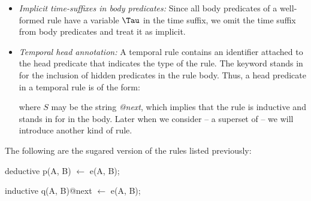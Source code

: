 \begin{itemize}
%
%
\item {\em Implicit time-suffixes in body predicates:} Since all body
predicates of a well-formed rule have a variable $\Tau$ in the time
suffix, we omit the time suffix from body predicates and treat it as implicit.
%
\item {\em Temporal head annotation:} A temporal rule contains an identifier
attached to the head predicate that indicates 
the type of the rule. 
The keyword stands in for the inclusion of hidden predicates in the rule body.
Thus, a head predicate in a \slang temporal rule is of the form:


where $S$ 
may be the string \emph{@next}, which implies that the rule is inductive
and stands in for  in the body.
Later when we consider \lang -- a superset of \slang -- we will introduce
another kind of rule.

%
%
%
%
%
\end{itemize}


\begin{example}

The following are the sugared version of the rules listed previously:

\begin{Dedalus}
deductive
p(A, B) \(\leftarrow\) e(A, B);
  
inductive 
q(A, B)@next \(\leftarrow\) e(A, B);
\end{Dedalus}


\end{example}


